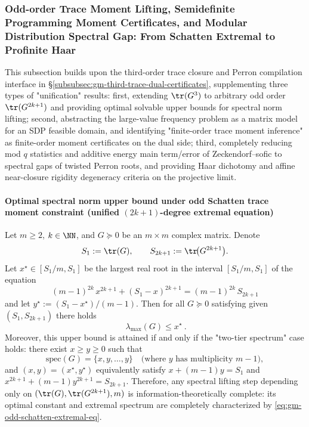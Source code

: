 \subsubsection{Odd-order Trace Moment Lifting, Semidefinite Programming Moment Certificates, and Modular Distribution Spectral Gap: From Schatten Extremal to Profinite Haar}\label{subsubsec:gm-odd-moment-sdp-modq-profinite}
This subsection builds upon the third-order trace closure and Perron compilation interface in \S\ref{subsubsec:gm-third-trace-dual-certificates}, supplementing three types of "unification" results: first, extending \(\tr(G^3)\) to arbitrary odd order \(\tr(G^{2k+1})\) and providing optimal solvable upper bounds for spectral norm lifting; second, abstracting the large-value frequency problem as a matrix model for an SDP feasible domain, and identifying "finite-order trace moment inference" as finite-order moment certificates on the dual side; third, completely reducing mod \(q\) statistics and additive energy main term/error of Zeckendorf--sofic to spectral gaps of twisted Perron roots, and providing Haar dichotomy and affine near-closure rigidity degeneracy criteria on the projective limit.

\paragraph{Optimal spectral norm upper bound under odd Schatten trace moment constraint (unified \texorpdfstring{$(2k+1)$}{2k+1}-degree extremal equation)}
\begin{theorem}\label{thm:gm-odd-schatten-spectral-norm-extremal}
Let \(m\ge 2\), \(k\in\NN\), and \(G\succeq 0\) be an \(m\times m\) complex matrix.
Denote
\[
S_1:=\tr(G),\qquad S_{2k+1}:=\tr\!\bigl(G^{2k+1}\bigr).
\]
Let \(x^\star\in[S_1/m,S_1]\) be the largest real root in the interval \([S_1/m,S_1]\) of the equation
\begin{equation}\label{eq:gm-odd-schatten-extremal-eq}
\boxed{\ (m-1)^{2k}\,x^{2k+1}+(S_1-x)^{2k+1}=(m-1)^{2k}\,S_{2k+1}\ }
\end{equation}
and let \(y^\star:=(S_1-x^\star)/(m-1)\).
Then for all \(G\succeq0\) satisfying given \((S_1,S_{2k+1})\) there holds
\[
\boxed{\ \lambda_{\max}(G)\le x^\star\ }.
\]
Moreover, this upper bound is attained if and only if the "two-tier spectrum" case holds: there exist \(x\ge y\ge 0\) such that
\[
\mathrm{spec}(G)=\{x,y,\dots,y\}\quad\text{(where \(y\) has multiplicity \(m-1\))},
\]
and \((x,y)=(x^\star,y^\star)\) equivalently satisfy
\(
x+(m-1)y=S_1
\) and
\(
x^{2k+1}+(m-1)y^{2k+1}=S_{2k+1}.
\)
Therefore, any spectral lifting step depending only on \((\tr(G),\tr(G^{2k+1}),m)\) is information-theoretically complete: its optimal constant and extremal spectrum are completely characterized by \eqref{eq:gm-odd-schatten-extremal-eq}.
\end{theorem}

